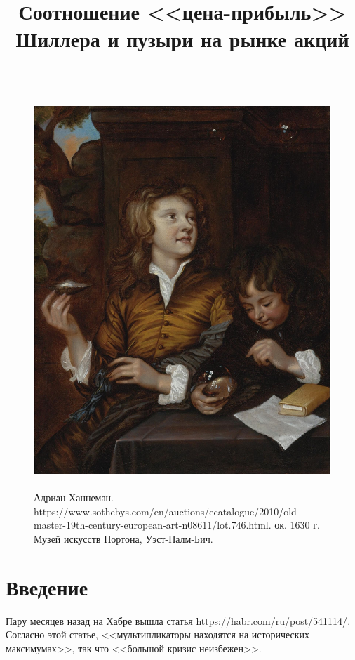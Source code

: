 

\title{Соотношение <<цена-прибыль>> Шиллера и пузыри на рынке акций}

\usepackage[font=small]{caption}

\usepackage{enumitem}



\maketitle
\thispagestyle{empty}

\begin{figure}[h]
\centering
\includegraphics[height=14.9cm]{img/two_boys_blowing_bubbles.jpg}
\captionsetup{labelformat=empty}
\caption{\small{
    Адриан Ханнеман.
    {https://www.sothebys.com/en/auctions/ecatalogue/2010/old-master-19th-century-european-art-n08611/lot.746.html}.
    ок. 1630 г. Музей искусств Нортона, Уэст-Палм-Бич.
}}
\end{figure}
\setcounter{figure}{0}
\newpage

\section*{Введение}
Пару месяцев назад на Хабре вышла статья
{https://habr.com/ru/post/541114/}. Согласно этой статье, <<мультипликаторы 
находятся на исторических максимумах>>, так что <<большой кризис неизбежен>>.

